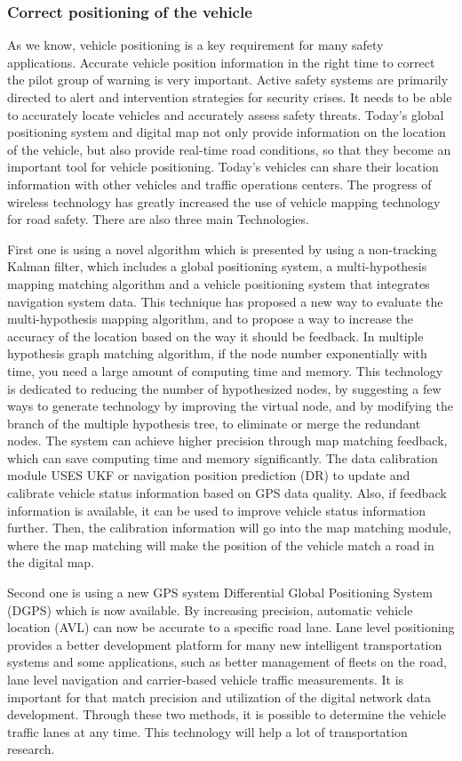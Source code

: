 \documentclass[onecolumn, draftclsnofoot,10pt, compsoc]{IEEEtran}
\begin{document}
\subsubsection{Correct positioning of the vehicle}
As we know, vehicle positioning is a key requirement for many safety applications.
Accurate vehicle position information in the right time to correct the pilot group of warning is very important.
Active safety systems are primarily directed to alert and intervention strategies for security crises.
It needs to be able to accurately locate vehicles and accurately assess safety threats.
Today's global positioning system and digital map not only provide information on the location of the vehicle, but also provide real-time road conditions, so that they become an important tool for vehicle positioning.
Today's vehicles can share their location information with other vehicles and traffic operations centers.
The progress of wireless technology has greatly increased the use of vehicle mapping technology for road safety.
There are also three main Technologies.

First one is using a novel algorithm which is presented by using a non-tracking Kalman filter, which includes a global positioning system, a multi-hypothesis mapping matching algorithm and a vehicle positioning system that integrates navigation system data.
This technique has proposed a new way to evaluate the multi-hypothesis mapping algorithm, and to propose a way to increase the accuracy of the location based on the way it should be feedback.
In multiple hypothesis graph matching algorithm, if the node number exponentially with time, you need a large amount of computing time and memory.
This technology is dedicated to reducing the number of hypothesized nodes, by suggesting a few ways to generate technology by improving the virtual node, and by modifying the branch of the multiple hypothesis tree, to eliminate or merge the redundant nodes.
The system can achieve higher precision through map matching feedback, which can save computing time and memory significantly.
The data calibration module USES UKF or navigation position prediction (DR) to update and calibrate vehicle status information based on GPS data quality.
Also, if feedback information is available, it can be used to improve vehicle status information further.
Then, the calibration information will go into the map matching module, where the map matching will make the position of the vehicle match a road in the digital map.

Second one is using a new GPS system Differential Global Positioning System (DGPS) which is now available.
By increasing precision, automatic vehicle location (AVL) can now be accurate to a specific road lane.
Lane level positioning provides a better development platform for many new intelligent transportation systems and some applications, such as better management of fleets on the road, lane level navigation and carrier-based vehicle traffic measurements.
It is important for that match precision and utilization of the digital network data development.
Through these two methods, it is possible to determine the vehicle traffic lanes at any time.
This technology will help a lot of transportation research.
\end{document}

